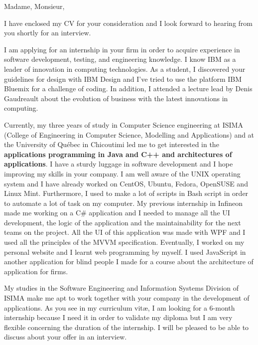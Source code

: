 \date{\today}
\opening{Madame, Monsieur,}
\closing{I have enclosed my CV for your consideration and I look forward to hearing from you shortly for an interview.}

\makelettertitle

I am applying for an internship in your firm in order to acquire experience in software development, testing, and engineering knowledge. I know IBM as a leader of innovation in computing technologies. As a student, I discovered your guidelines for design with IBM Design and I've tried to use the platform IBM Bluemix for a challenge of coding. In addition, I attended a lecture lead by Denis Gaudreault about the evolution of business with the latest innovations in computing.

Currently, my three years of study in Computer Science engineering at ISIMA (College of Engineering in Computer Science, Modelling and Applications) and at the University of Québec in Chicoutimi led me to get interested in the \textbf{applications programming in Java and C++ and architectures of applications}. I have a sturdy luggage in software development and I hope improving my skills in your company. I am well aware of the UNIX operating system and I have already worked on CentOS, Ubuntu, Fedora, OpenSUSE and Linux Mint. Furthermore, I used to make a lot of scripts in Bash script in order to automate a lot of task on my computer. My previous internship in Infineon made me working on a C\# application and I needed to manage all the UI development, the logic of the application and the maintainability for the next teams on the project. All the UI of this application was made with WPF and I used all the principles of the MVVM specification. Eventually, I worked on my personal website and I learnt web programming by myself. I used JavaScript in another application for blind people I made for a course about the architecture of application for firms.

My studies in the Software Engineering and Information Systems Division of ISIMA make me apt to work together with your company in the development of applications. As you see in my curriculum vit\ae{}, I am looking for a 6-month internship because I need it in order to validate my diploma but I am very flexible concerning the duration of the internship. I will be pleased to be able to discuss about your offer in an interview.

\makeletterclosing
